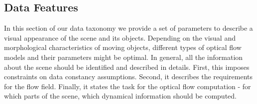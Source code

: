 \subsection{Data Features}




%
%


In this section of our data taxonomy we provide a set of parameters to describe a visual appearance of the scene and its objects. Depending on the visual and morphological characteristics of moving objects, different types of optical flow models and their parameters might be optimal. 
In general, all the information about the scene should be identified and described in details. First, this imposes constraints on data constancy assumptions. Second, it describes the requirements for the flow field. Finally, it states the task for the optical flow computation - for which parts of the scene, which dynamical information should be computed. 

